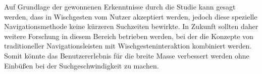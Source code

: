 \documentclass[11pt,a4paper]{report}
\begin{document}
Auf Grundlage der gewonnenen Erkenntnisse durch die Studie kann gesagt werden, dass in Wischgesten vom Nutzer akzeptiert werden, jedoch diese spezielle Navigationsmethode keine kürzeren Suchzeiten bewirkte. In Zukunft sollten daher weitere Forschung in diesem Bereich betrieben werden, bei der die Konzepte von traditioneller Navigationsleisten mit Wischgesteninteraktion kombiniert werden. Somit könnte das Benutzererlebnis für die breite Masse verbessert werden ohne Einbüßen bei der Suchgeschwindigkeit zu machen.



















\clearemptydoublepage
{}

	
\end{document}
